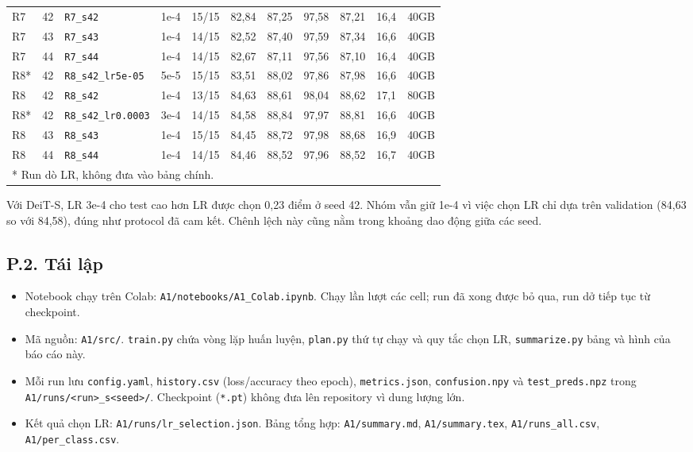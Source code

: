 \documentclass[12pt,a4paper]{article}
\begin{document}
{\begin{longtable}{llllcccccrc}
R7 & 42 & \texttt{R7\_s42} & 1e-4 & 15/15 & 82,84 & 87,25 & 97,58 & 87,21 & 16,4 & 40GB \\
R7 & 43 & \texttt{R7\_s43} & 1e-4 & 14/15 & 82,52 & 87,40 & 97,59 & 87,34 & 16,6 & 40GB \\
R7 & 44 & \texttt{R7\_s44} & 1e-4 & 14/15 & 82,67 & 87,11 & 97,56 & 87,10 & 16,4 & 40GB \\
R8* & 42 & \texttt{R8\_s42\_lr5e-05} & 5e-5 & 15/15 & 83,51 & 88,02 & 97,86 & 87,98 & 16,6 & 40GB \\
R8 & 42 & \texttt{R8\_s42} & 1e-4 & 13/15 & 84,63 & 88,61 & 98,04 & 88,62 & 17,1 & 80GB \\
R8* & 42 & \texttt{R8\_s42\_lr0.0003} & 3e-4 & 14/15 & 84,58 & 88,84 & 97,97 & 88,81 & 16,6 & 40GB \\
R8 & 43 & \texttt{R8\_s43} & 1e-4 & 15/15 & 84,45 & 88,72 & 97,98 & 88,68 & 16,9 & 40GB \\
R8 & 44 & \texttt{R8\_s44} & 1e-4 & 14/15 & 84,46 & 88,52 & 97,96 & 88,52 & 16,7 & 40GB \\
\bottomrule
\multicolumn{11}{l}{* Run dò LR, không đưa vào bảng chính.}
\end{longtable}
}

Với DeiT-S, LR 3e-4 cho test cao hơn LR được chọn 0,23 điểm ở seed 42. Nhóm vẫn
giữ 1e-4 vì việc chọn LR chỉ dựa trên validation (84,63 so với 84,58), đúng như
protocol đã cam kết. Chênh lệch này cũng nằm trong khoảng dao động giữa các seed.

\subsection*{P.2. Tái lập}

\begin{itemize}
\item Notebook chạy trên Colab: \texttt{A1/notebooks/A1\_Colab.ipynb}. Chạy lần lượt
các cell; run đã xong được bỏ qua, run dở tiếp tục từ checkpoint.
\item Mã nguồn: \texttt{A1/src/}. \texttt{train.py} chứa vòng lặp huấn luyện,
\texttt{plan.py} thứ tự chạy và quy tắc chọn LR, \texttt{summarize.py} bảng và hình
của báo cáo này.
\item Mỗi run lưu \texttt{config.yaml}, \texttt{history.csv} (loss/accuracy theo epoch),
\texttt{metrics.json}, \texttt{confusion.npy} và \texttt{test\_preds.npz} trong
\texttt{A1/runs/<run>\_s<seed>/}. Checkpoint (\texttt{*.pt}) không đưa lên repository
vì dung lượng lớn.
\item Kết quả chọn LR: \texttt{A1/runs/lr\_selection.json}. Bảng tổng hợp:
\texttt{A1/summary.md}, \texttt{A1/summary.tex}, \texttt{A1/runs\_all.csv},
\texttt{A1/per\_class.csv}.
\end{itemize}
\end{document}
